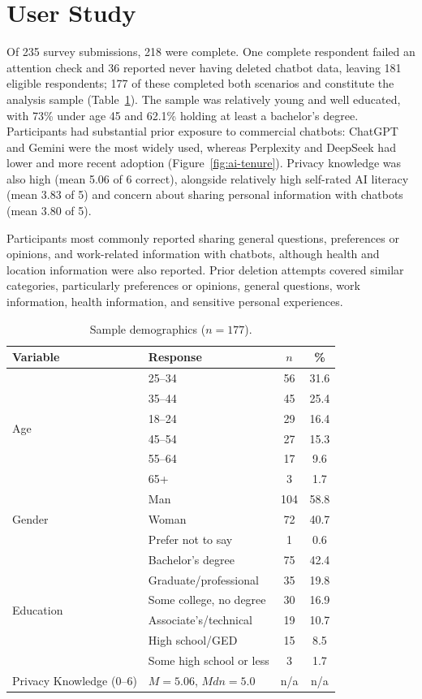 \documentclass[conference,compsoc]{IEEEtran}
\begin{document}
\section{User Study}

\label{sec:sample-knowledge}

Of 235 survey submissions, 218 were complete. One complete respondent failed an attention check and 36 reported never having deleted chatbot data, leaving 181 eligible respondents; 177 of these completed both scenarios and constitute the analysis sample (Table~\ref{tab:demographics}). The sample was relatively young and well educated, with 73\% under age 45 and 62.1\% holding at least a bachelor's degree. Participants had substantial prior exposure to commercial chatbots: ChatGPT and Gemini were the most widely used, whereas Perplexity and DeepSeek had lower and more recent adoption (Figure~\ref{fig:ai-tenure}). Privacy knowledge was also high (mean 5.06 of 6 correct), alongside relatively high self-rated AI literacy (mean 3.83 of 5) and concern about sharing personal information with chatbots (mean 3.80 of 5).

Participants most commonly reported sharing general questions, preferences or opinions, and work-related information with chatbots, although health and location information were also reported. Prior deletion attempts covered similar categories, particularly preferences or opinions, general questions, work information, health information, and sensitive personal experiences.


\begin{table}[t]
\centering
\caption{Sample demographics ($n=177$).}
\label{tab:demographics}
\small
\setlength{\tabcolsep}{3.5pt}
\begin{tabular}{llcc}
\toprule
Variable & Response & $n$ & \% \\
\midrule
\multirow{6}{*}{Age}
 & 25--34 & 56 & 31.6 \\
 & 35--44 & 45 & 25.4 \\
 & 18--24 & 29 & 16.4 \\
 & 45--54 & 27 & 15.3 \\
 & 55--64 & 17 & 9.6 \\
 & 65+    & 3  & 1.7 \\
\midrule
\multirow{3}{*}{Gender}
 & Man               & 104 & 58.8 \\
 & Woman             & 72  & 40.7 \\
 & Prefer not to say & 1   & 0.6 \\
\midrule
\multirow{6}{*}{Education}
 & Bachelor's degree      & 75 & 42.4 \\
 & Graduate/professional  & 35 & 19.8 \\
 & Some college, no degree & 30 & 16.9 \\
 & Associate's/technical  & 19 & 10.7 \\
 & High school/GED        & 15 & 8.5 \\
 & Some high school or less & 3 & 1.7 \\
\midrule
Privacy Knowledge (0--6) & $M=5.06$, $Mdn=5.0$ & n/a & n/a \\
\bottomrule
\end{tabular}
\end{table}
\end{document}
